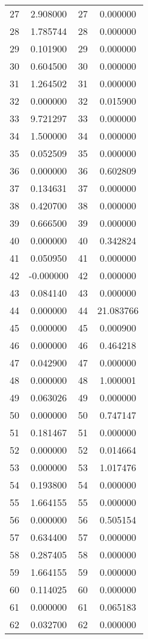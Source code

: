 \documentclass[12pt]{article}
\begin{document}
\begin{longtable}{@{}cccc@{}}
27 & 2.908000 & 27 & 0.000000 \\
28 & 1.785744 & 28 & 0.000000 \\
29 & 0.101900 & 29 & 0.000000 \\
30 & 0.604500 & 30 & 0.000000 \\
31 & 1.264502 & 31 & 0.000000 \\
32 & 0.000000 & 32 & 0.015900 \\
33 & 9.721297 & 33 & 0.000000 \\
34 & 1.500000 & 34 & 0.000000 \\
35 & 0.052509 & 35 & 0.000000 \\
36 & 0.000000 & 36 & 0.602809 \\
37 & 0.134631 & 37 & 0.000000 \\
38 & 0.420700 & 38 & 0.000000 \\
39 & 0.666500 & 39 & 0.000000 \\
40 & 0.000000 & 40 & 0.342824 \\
41 & 0.050950 & 41 & 0.000000 \\
42 & -0.000000 & 42 & 0.000000 \\
43 & 0.084140 & 43 & 0.000000 \\
44 & 0.000000 & 44 & 21.083766 \\
45 & 0.000000 & 45 & 0.000900 \\
46 & 0.000000 & 46 & 0.464218 \\
47 & 0.042900 & 47 & 0.000000 \\
48 & 0.000000 & 48 & 1.000001 \\
49 & 0.063026 & 49 & 0.000000 \\
50 & 0.000000 & 50 & 0.747147 \\
51 & 0.181467 & 51 & 0.000000 \\
52 & 0.000000 & 52 & 0.014664 \\
53 & 0.000000 & 53 & 1.017476 \\
54 & 0.193800 & 54 & 0.000000 \\
55 & 1.664155 & 55 & 0.000000 \\
56 & 0.000000 & 56 & 0.505154 \\
57 & 0.634400 & 57 & 0.000000 \\
58 & 0.287405 & 58 & 0.000000 \\
59 & 1.664155 & 59 & 0.000000 \\
60 & 0.114025 & 60 & 0.000000 \\
61 & 0.000000 & 61 & 0.065183 \\
62 & 0.032700 & 62 & 0.000000 \\

\end{longtable}
\end{document}
